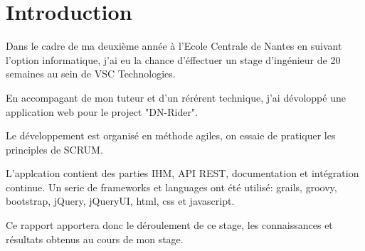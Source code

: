 \chapter*{Introduction}
\label{chap:Introduction}

Dans le cadre de ma deuxième année à l'Ecole Centrale de Nantes en suivant l'option informatique,
j'ai eu la chance d'éffectuer un stage d'ingénieur de 20 semaines au sein de VSC Technologies.

En accompagant de mon tuteur et d'un rérérent technique, j'ai dévoloppé une application web pour le project "DN-Rider".

Le développement est organisé en méthode agiles, on essaie de pratiquer les principles de SCRUM.

L'applcation contient des parties IHM, API REST, documentation et intégration continue.
Un serie de frameworks et languages ont été utilisé: grails, groovy, bootstrap, jQuery, jQueryUI, html, css et javascript.

Ce rapport apportera donc le déroulement de ce stage, les connaissances et résultats obtenus au cours de mon stage.
